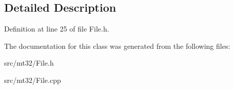 \subsection{Detailed Description}


Definition at line 25 of file File.\-h.



The documentation for this class was generated from the following files\-:\begin{DoxyCompactItemize}
\item 
src/mt32/File.\-h\item 
src/mt32/File.\-cpp\end{DoxyCompactItemize}
